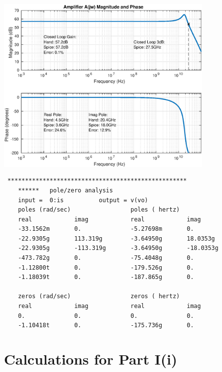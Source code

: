 \documentclass[12pt,a4paper]{article}
\begin{document}
\pagebreak

{\centering
	\includegraphics[width=0.8\textwidth]{plots/part_h.eps}
\par}

\begin{verbatim}
 ***************************************************
    ******   pole/zero analysis
    input =  0:is          output = v(vo)
    poles (rad/sec)                 poles ( hertz)
    real            imag            real            imag
    -33.1562m       0.              -5.27698m       0.
    -22.9305g       113.319g        -3.64950g       18.0353g
    -22.9305g       -113.319g       -3.64950g       -18.0353g
    -473.782g       0.              -75.4048g       0.
    -1.12800t       0.              -179.526g       0.
    -1.18039t       0.              -187.865g       0.

    zeros (rad/sec)                 zeros ( hertz)
    real            imag            real            imag
    0.              0.              0.              0.
    -1.10418t       0.              -175.736g       0.

\end{verbatim}

\pagebreak


\section{Calculations for Part I(i)}

\end{document}
